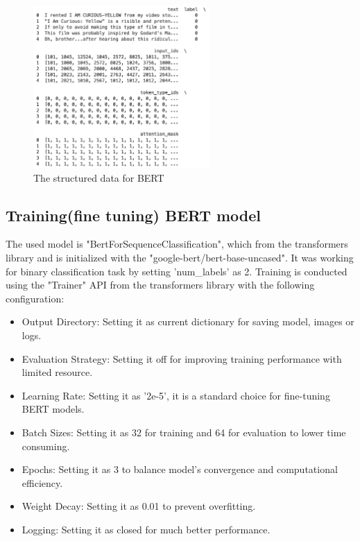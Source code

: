 \begin{figure}[ht]
    \centering
    \includegraphics[width=0.6\textwidth]{pics/bert_data_treate.png}
    \caption{The structured data for BERT}
\end{figure}

\subsection{Training(fine tuning) BERT model}
The used model is "BertForSequenceClassification", which from the transformers library and is initialized with the "google-bert/bert-base-uncased". It was working for binary classification task by setting 'num\_labels' as 2. Training is conducted using the "Trainer" API from the transformers library with the following configuration:

\begin{itemize}
    \item Output Directory: Setting it as current dictionary for saving model, images or logs.
    \item Evaluation Strategy: Setting it off for improving training performance with limited resource.
    \item Learning Rate: Setting it as '2e-5', it is a standard choice for fine-tuning BERT models.
    \item Batch Sizes: Setting it as 32 for training and 64 for evaluation to lower time consuming.
    \item Epochs: Setting it as 3 to balance model's convergence and computational efficiency.
    \item Weight Decay: Setting it as 0.01 to prevent overfitting.
    \item Logging: Setting it as closed for much better performance.
\end{itemize}

